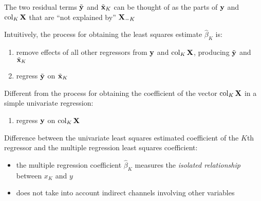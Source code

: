 \begin{frame}

    \vspace{2em}
    The two residual terms $\tilde {{\mathbf y}}$ and $\tilde
    {{\mathbf x}}_K$ can be thought of as the parts of ${\mathbf y}$ and
    $\operatorname{col}_K \mathbf X$ that are ``not explained by'' $\mathbf X_{-K}$
    
    Intuitively, the process for obtaining the least squares estimate $\hat
    \beta_K$ is:
    \begin{enumerate}
        \item remove effects of all other regressors from ${\mathbf y}$ and
            $\operatorname{col}_K \mathbf X$, producing $\tilde {{\mathbf y}}$ and $\tilde
            {{\mathbf x}}_K$
        \item regress $\tilde {{\mathbf y}}$ on $\tilde {{\mathbf x}}_K$
    \end{enumerate}
    
    \vspace{.7em}
    Different from the process for obtaining the coefficient of 
    the vector $\operatorname{col}_K \mathbf X$ in a simple univariate regression:
    \begin{enumerate}
        \item regress ${\mathbf y}$ on $\operatorname{col}_K \mathbf X$
    \end{enumerate}
    
\end{frame}

\begin{frame}

    \vspace{2em}
    Difference between the univariate least squares estimated coefficient of 
    the $K$th regressor and the multiple regression least squares coefficient:
    \begin{itemize}
        \item the
    multiple regression coefficient $\hat \beta_K$ measures the \emph{isolated
    relationship} between $x_K$ and $y$
        \item does not take into account indirect
    channels involving other variables
    \end{itemize}
\end{frame}

